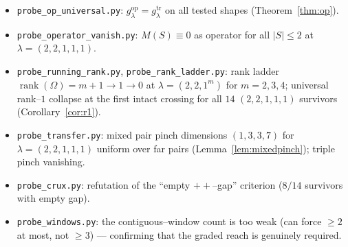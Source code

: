 \documentclass[11pt]{article}
\theoremstyle{definition}
\DeclareMathOperator{\rank}{rank}
\newcommand{\la}{\lambda}
\begin{document}
\begin{itemize}
\item \texttt{probe\_op\_universal.py}: $g^{\mathrm{op}}_\la=g^{\mathrm{tr}}_\la$
on all tested shapes (Theorem~\ref{thm:op}).
\item \texttt{probe\_operator\_vanish.py}: $M(S)\equiv0$ as operator for all
$|S|\le2$ at $\la=(2,2,1,1,1)$.
\item \texttt{probe\_running\_rank.py}, \texttt{probe\_rank\_ladder.py}: rank
ladder $\rank(\Omega)=m+1\to1\to0$ at $\la=(2,2,1^m)$ for $m=2,3,4$;
universal rank--$1$ collapse at the first intact crossing for all $14$
$(2,2,1,1,1)$ survivors (Corollary~\ref{cor:r1}).
\item \texttt{probe\_transfer.py}: mixed pair pinch dimensions $(1,3,3,7)$ for
$\la=(2,2,1,1,1)$ uniform over far pairs (Lemma~\ref{lem:mixedpinch}); triple
pinch vanishing.
\item \texttt{probe\_crux.py}: refutation of the ``empty $++$--gap'' criterion
($8/14$ survivors with empty gap).
\item \texttt{probe\_windows.py}: the contiguous--window count is too weak
\textup(can force $\ge2$ at most, not $\ge3$\textup) --- confirming that the
graded reach is genuinely required.
\end{itemize}
\end{document}
